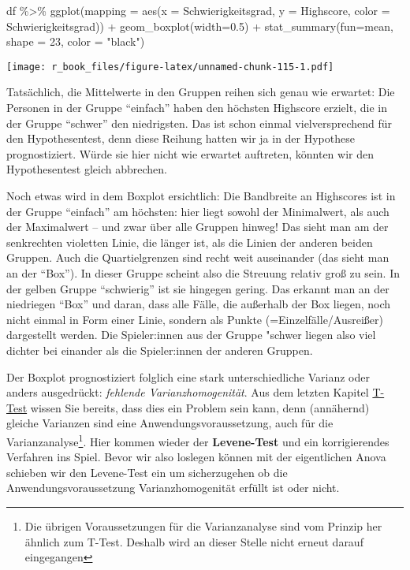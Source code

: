 \documentclass[
]{book}
\newenvironment{Shaded}{\begin{snugshade}}{\end{snugshade}}
\newcommand{\AttributeTok}[1]{\textcolor[rgb]{0.77,0.63,0.00}{#1}}
\newcommand{\DecValTok}[1]{\textcolor[rgb]{0.00,0.00,0.81}{#1}}
\newcommand{\FloatTok}[1]{\textcolor[rgb]{0.00,0.00,0.81}{#1}}
\newcommand{\FunctionTok}[1]{\textcolor[rgb]{0.00,0.00,0.00}{#1}}
\newcommand{\NormalTok}[1]{#1}
\newcommand{\SpecialCharTok}[1]{\textcolor[rgb]{0.00,0.00,0.00}{#1}}
\newcommand{\StringTok}[1]{\textcolor[rgb]{0.31,0.60,0.02}{#1}}
\begin{document}
\begin{Shaded}
\begin{Highlighting}[]
\NormalTok{df }\SpecialCharTok{\%\textgreater{}\%} 
  \FunctionTok{ggplot}\NormalTok{(}\AttributeTok{mapping =} \FunctionTok{aes}\NormalTok{(}\AttributeTok{x =}\NormalTok{ Schwierigkeitsgrad, }\AttributeTok{y =}\NormalTok{ Highscore, }\AttributeTok{color =}\NormalTok{ Schwierigkeitsgrad)) }\SpecialCharTok{+}
  \FunctionTok{geom\_boxplot}\NormalTok{(}\AttributeTok{width=}\FloatTok{0.5}\NormalTok{) }\SpecialCharTok{+}
  \FunctionTok{stat\_summary}\NormalTok{(}\AttributeTok{fun=}\NormalTok{mean, }\AttributeTok{shape =} \DecValTok{23}\NormalTok{, }\AttributeTok{color =} \StringTok{"black"}\NormalTok{)}
\end{Highlighting}
\end{Shaded}

\texttt{[image: r\_book\_files/figure-latex/unnamed-chunk-115-1.pdf]}

Tatsächlich, die Mittelwerte in den Gruppen reihen sich genau wie erwartet: Die Personen in der Gruppe ``einfach'' haben den höchsten Highscore erzielt, die in der Gruppe ``schwer'' den niedrigsten. Das ist schon einmal vielversprechend für den Hypothesentest, denn diese Reihung hatten wir ja in der Hypothese prognostiziert. Würde sie hier nicht wie erwartet auftreten, könnten wir den Hypothesentest gleich abbrechen.

Noch etwas wird in dem Boxplot ersichtlich: Die Bandbreite an Highscores ist in der Gruppe ``einfach'' am höchsten: hier liegt sowohl der Minimalwert, als auch der Maximalwert -- und zwar über alle Gruppen hinweg! Das sieht man am der senkrechten violetten Linie, die länger ist, als die Linien der anderen beiden Gruppen. Auch die Quartielgrenzen sind recht weit auseinander (das sieht man an der ``Box''). In dieser Gruppe scheint also die Streuung relativ groß zu sein. In der gelben Gruppe ``schwierig'' ist sie hingegen gering. Das erkannt man an der niedriegen ``Box'' und daran, dass alle Fälle, die außerhalb der Box liegen, noch nicht einmal in Form einer Linie, sondern als Punkte (=Einzelfälle/Ausreißer) dargestellt werden. Die Spieler:innen aus der Gruppe "schwer liegen also viel dichter bei einander als die Spieler:innen der anderen Gruppen.

Der Boxplot prognostiziert folglich eine stark unterschiedliche Varianz oder anders ausgedrückt: \emph{fehlende Varianzhomogenität}. Aus dem letzten Kapitel \protect\hyperlink{anwendungsvoraussetzungen-1}{T-Test} wissen Sie bereits, dass dies ein Problem sein kann, denn (annähernd) gleiche Varianzen sind eine Anwendungsvoraussetzung, auch für die Varianzanalyse\footnote{Die übrigen Voraussetzungen für die Varianzanalyse sind vom Prinzip her ähnlich zum T-Test. Deshalb wird an dieser Stelle nicht erneut darauf eingegangen}. Hier kommen wieder der \textbf{Levene-Test} und ein korrigierendes Verfahren ins Spiel. Bevor wir also loslegen können mit der eigentlichen Anova schieben wir den Levene-Test ein um sicherzugehen ob die Anwendungsvoraussetzung Varianzhomogenität erfüllt ist oder nicht.
\end{document}
